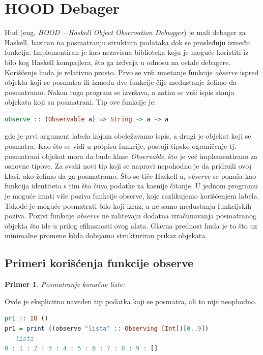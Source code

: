 \documentclass[a4paper]{article}
\newtheorem{primer}{Primer}[section]
\begin{document}
{ 

\section{HOOD Debager}
Hud (eng. {\em HOOD -- Haskell Object Observation Debugger}) je mali debager za Haskell, baziran na posmatranju struktura podataka dok se prosleđuju između funkcija.
Implementiran je kao nezavisna biblioteka koju je moguće koristiti iz bilo kog Haskell kompajlera, što ga izdvaja u odnosu na ostale debagere.
Korišćenje huda je relativno prosto. Prvo se vrši umetanje funkcije {\em observe} ispred objekta koji se posmatra ili između dve funkcije čije međustanje želimo da posmatramo.
Nakon toga program se izvršava, a zatim se vrši ispis stanja objekata koji su posmatrani.
Tip ove funkcije je:\newline \newline

\begin{lstlisting}[language=Haskell]
observe :: (Observable a) => String -> a -> a
\end{lstlisting} 

gde je prvi argument labela kojom obeležavamo ispis, a drugi je objekat koji se posmatra.
Kao što se vidi u potpisu funkcije, postoji tipsko ograničenje tj. posmatrani objekat mora da bude klase {\em Observable}, što je već implementirano za osnovne tipove.
Za svaki novi tip koji se napravi nepohodno je da  pridruži ovoj klasi, ako želimo da ga posmatramo.
Što se tiče Haskell-a, {\em observe} se ponaša kao funkcija identiteta s tim što čuva podatke za kasnije čitanje.
U jednom programu je moguće imati više poziva funkcije observe, koje razlikujemo korišćenjem labela.
Takođe je moguće posmatrati bilo koji izraz, a ne samo međustanja funkcijskih poziva.
Pozivi funkcije {\em observe} ne zahtevaju dodatna izračunavanja posmatranog objekta što ide u prilog efikasnosti ovog alata.
Glavna prednost huda je to što uz minimalne promene k\^{o}da dobijamo strukturiran prikaz objekata.

\subsection{Primeri korišćenja funkcije observe}
\begin{primer}
 Posmatranje konačne liste:
\end{primer}
Ovde je eksplicitno naveden tip podatka koji se posmatra, ali to nije neophodno.
\begin{lstlisting}[language=Haskell]
pr1 :: IO ()
pr1 = print ((observe "lista" :: Observing [Int])[0..9])
-- lista
0 : 1 : 2 : 3 : 4 : 5 : 6 : 7 : 8 : 9 : []
\end{lstlisting}

}
\end{document}
